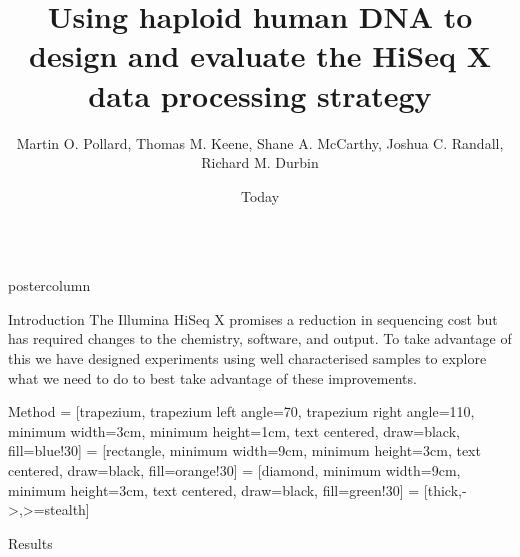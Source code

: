 \documentclass[final]{beamer}
\title{Using haploid human DNA to design and evaluate the HiSeq X data processing strategy}
\author{Martin O. Pollard, Thomas M. Keene, Shane A. McCarthy, Joshua C. Randall, Richard M. Durbin}
\date{Today}
\begin{document}
\begin{frame}
    \begin{columns}
    \begin{column}{.49\textwidth}
        \begin{beamercolorbox}[center,wd=\textwidth]{postercolumn}
            \begin{minipage}[T]{.95\textwidth}  %
            \parbox[t][\columnheight]{\textwidth}{
            \begin{block}{Introduction}
            The Illumina HiSeq X promises a reduction in sequencing cost but has required changes to the chemistry, software, and output.  To take advantage of this we have designed experiments using well characterised samples to explore what we need to do to best take advantage of these improvements. 
            \end{block}
            \begin{block}{Method}
                 = [trapezium, trapezium left angle=70, trapezium right angle=110, minimum width=3cm, minimum height=1cm, text centered, draw=black, fill=blue!30]
                 = [rectangle, minimum width=9cm, minimum height=3cm, text centered, draw=black, fill=orange!30]
                 = [diamond, minimum width=9cm, minimum height=3cm, text centered, draw=black, fill=green!30]
                 = [thick,->,>=stealth]
                \centering
            \end{block}
            \begin{block}{Results}
            \end{block}
            \vfill
                      }


\end{minipage}
\end{beamercolorbox}
\end{column}
\end{columns}
\end{frame}
\end{document}
